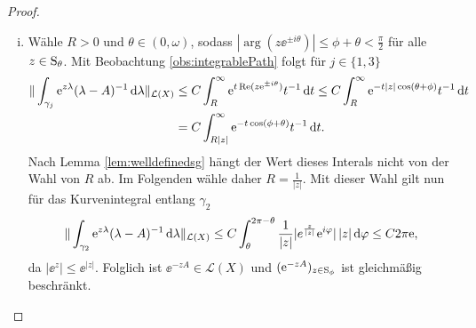 \begin{proof}
  \begin{enumerate}[(i)]
    \item Wähle $R > 0$ und $\theta \in (0,\omega)$, sodass  $|\arg(z \ee^{\pm i\theta})| \leq \phi + \theta < \frac{\pi}{2}$ für alle $z \in \mathrm{S}_\theta$.
      Mit Beobachtung \ref{obs:integrablePath} folgt für $j \in \{1,3\}$
      \begin{align*}
        \| \int_{\gamma_{j}} \mathrm{e}^{z \lambda} (\lambda - A)^{-1} \, {\operatorname{d}\!{\lambda}} \|_{\mathcal L(X)} 
        &\leq C\int_R^\infty \mathrm{e}^{t \operatorname{Re}(z \mathrm{e}^{\pm i\theta})} t^{-1} \, {\operatorname{d}\!{t}}
        \leq C \int_R^\infty \mathrm{e}^{-t |z| \cos(\theta + \phi)} t^{-1} \, {\operatorname{d}\!{t}} \\
        &= C \int_{R|z|}^\infty \mathrm{e}^{-t \cos(\phi+\theta)} t^{-1} \, {\operatorname{d}\!{t}}.
      \end{align*}
      Nach Lemma \ref{lem:welldefinedsg} hängt der Wert dieses Interals nicht von der Wahl von $R$ ab. 
      Im Folgenden wähle daher $R = \frac{1}{|z|}$.
      Mit dieser Wahl gilt nun für das Kurvenintegral entlang $\gamma_2$
      \begin{align*}
        \|\int_{\gamma_2} \mathrm{e}^{z \lambda} (\lambda - A)^{-1} \, {\operatorname{d}\!{\lambda}} \|_{\mathcal L(X)}
        \leq C\int_\theta^{2\pi - \theta} \frac{1}{|z|} |e^{\frac{z}{|z|}} \mathrm{e}^{i \varphi} | \, |z| \, {\operatorname{d}\!{\varphi}}
        \leq C 2\pi \mathrm{e},
      \end{align*}
      da $|\ee^z| \leq \ee^{|z|}$.
      Folglich ist $\ee^{-z A} \in \mathcal{L}(X)$ und $(\mathrm{e}^{-zA})_{z \in \mathrm{S}_\phi}$ ist gleichmäßig beschränkt.


\end{enumerate}
\end{proof}
